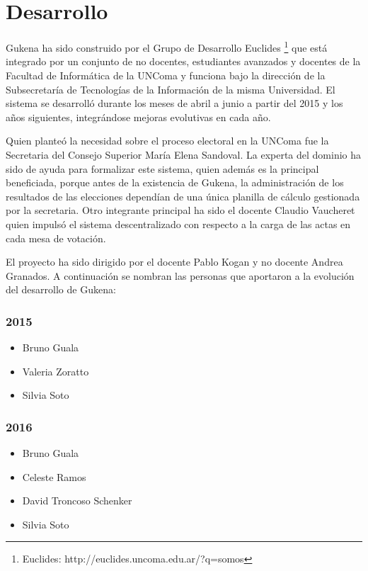 \section{Desarrollo}
Gukena ha sido construido por el Grupo de Desarrollo Euclides \footnote{Euclides: http://euclides.uncoma.edu.ar/?q=somos} que está integrado por un conjunto de no docentes, estudiantes avanzados y docentes de la Facultad de Informática de la UNComa y funciona bajo la dirección de la Subsecretaría de Tecnologías de la Información de la misma Universidad. El sistema se desarrolló durante los meses de abril a junio a partir del 2015 y los años siguientes, integrándose mejoras evolutivas en cada año.

Quien planteó la necesidad sobre el proceso electoral en la UNComa fue la Secretaria del Consejo Superior María Elena Sandoval. La experta del dominio ha sido de ayuda para formalizar este sistema, quien además es la principal beneficiada, porque antes de la existencia de Gukena, la administración de los resultados de las elecciones dependían de una única planilla de cálculo gestionada por la secretaria. Otro integrante principal ha sido el docente Claudio Vaucheret quien impulsó el sistema descentralizado con respecto a la carga de las actas en cada mesa de votación.

El proyecto ha sido dirigido por el docente Pablo Kogan y no docente Andrea Granados. \newline
A continuación se nombran las personas que aportaron a la evolución del desarrollo de Gukena:
\subsubsection{2015}
\begin{itemize}
    \item Bruno Guala
    \item Valeria Zoratto
    \item Silvia Soto
\end{itemize}
\subsubsection{2016}
\begin{itemize}
    \item Bruno Guala
    \item Celeste Ramos
    \item David Troncoso Schenker
    \item Silvia Soto
\end{itemize}
